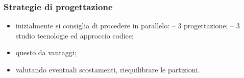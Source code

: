     \subsubsection{Strategie di progettazione}
        \begin{itemize}
            \item inizialmente si consiglia di procedere in parallelo:
                \subitem -- 3 progettazione;
                \subitem -- 3 studio tecnologie ed approccio codice;
            \item questo da vantaggi;
            \item valutando eventuali scostamenti, riequilibrare le partizioni.
        \end{itemize}








